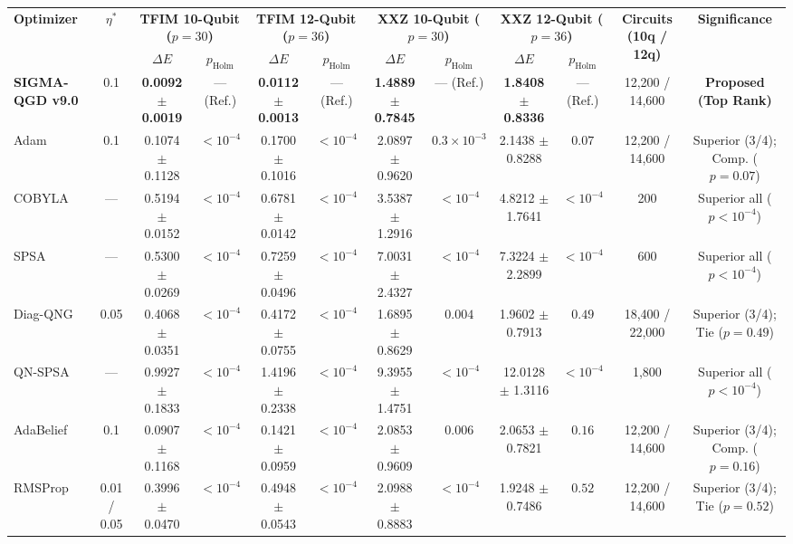 \documentclass[11pt,a4paper]{article}
\begin{document}
\begin{table}[t]
{\begin{tabular}{lccccccccccc}
\toprule
\multirow{2}{*}{\textbf{Optimizer}} & \multirow{2}{*}{$\eta^*$} & \multicolumn{2}{c}{\textbf{TFIM 10-Qubit ($p=30$)}} & \multicolumn{2}{c}{\textbf{TFIM 12-Qubit ($p=36$)}} & \multicolumn{2}{c}{\textbf{XXZ 10-Qubit ($p=30$)}} & \multicolumn{2}{c}{\textbf{XXZ 12-Qubit ($p=36$)}} & \multirow{2}{*}{\textbf{Circuits (10q / 12q)}} & \multirow{2}{*}{\textbf{Significance}} \\
\cmidrule(lr){3-4} \cmidrule(lr){5-6} \cmidrule(lr){7-8} \cmidrule(lr){9-10}
& & $\Delta E$ & $p_{\text{Holm}}$ & $\Delta E$ & $p_{\text{Holm}}$ & $\Delta E$ & $p_{\text{Holm}}$ & $\Delta E$ & $p_{\text{Holm}}$ & & \\
\midrule
\textbf{SIGMA-QGD v9.0} & 0.1 & \textbf{0.0092 $\pm$ 0.0019} & --- (Ref.) & \textbf{0.0112 $\pm$ 0.0013} & --- (Ref.) & \textbf{1.4889 $\pm$ 0.7845} & --- (Ref.) & \textbf{1.8408 $\pm$ 0.8336} & --- (Ref.) & 12,200 / 14,600 & \textbf{Proposed (Top Rank)} \\
Adam & 0.1 & 0.1074 $\pm$ 0.1128 & $< 10^{-4}$ & 0.1700 $\pm$ 0.1016 & $< 10^{-4}$ & 2.0897 $\pm$ 0.9620 & $0.3 \times 10^{-3}$ & 2.1438 $\pm$ 0.8288 & $0.07$ & 12,200 / 14,600 & Superior (3/4); Comp. ($p=0.07$) \\
COBYLA & --- & 0.5194 $\pm$ 0.0152 & $< 10^{-4}$ & 0.6781 $\pm$ 0.0142 & $< 10^{-4}$ & 3.5387 $\pm$ 1.2916 & $< 10^{-4}$ & 4.8212 $\pm$ 1.7641 & $< 10^{-4}$ & 200 & Superior all ($p < 10^{-4}$) \\
SPSA & --- & 0.5300 $\pm$ 0.0269 & $< 10^{-4}$ & 0.7259 $\pm$ 0.0496 & $< 10^{-4}$ & 7.0031 $\pm$ 2.4327 & $< 10^{-4}$ & 7.3224 $\pm$ 2.2899 & $< 10^{-4}$ & 600 & Superior all ($p < 10^{-4}$) \\
Diag-QNG & 0.05 & 0.4068 $\pm$ 0.0351 & $< 10^{-4}$ & 0.4172 $\pm$ 0.0755 & $< 10^{-4}$ & 1.6895 $\pm$ 0.8629 & $0.004$ & 1.9602 $\pm$ 0.7913 & $0.49$ & 18,400 / 22,000 & Superior (3/4); Tie ($p=0.49$) \\
QN-SPSA & --- & 0.9927 $\pm$ 0.1833 & $< 10^{-4}$ & 1.4196 $\pm$ 0.2338 & $< 10^{-4}$ & 9.3955 $\pm$ 1.4751 & $< 10^{-4}$ & 12.0128 $\pm$ 1.3116 & $< 10^{-4}$ & 1,800 & Superior all ($p < 10^{-4}$) \\
AdaBelief & 0.1 & 0.0907 $\pm$ 0.1168 & $< 10^{-4}$ & 0.1421 $\pm$ 0.0959 & $< 10^{-4}$ & 2.0853 $\pm$ 0.9609 & $0.006$ & 2.0653 $\pm$ 0.7821 & $0.16$ & 12,200 / 14,600 & Superior (3/4); Comp. ($p=0.16$) \\
RMSProp & 0.01 / 0.05 & 0.3996 $\pm$ 0.0470 & $< 10^{-4}$ & 0.4948 $\pm$ 0.0543 & $< 10^{-4}$ & 2.0988 $\pm$ 0.8883 & $< 10^{-4}$ & 1.9248 $\pm$ 0.7486 & $0.52$ & 12,200 / 14,600 & Superior (3/4); Tie ($p=0.52$) \\

\end{tabular}}
\end{table}
\end{document}
